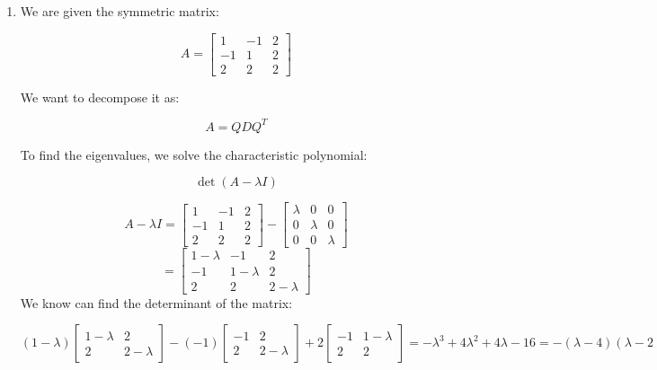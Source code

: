 \documentclass[12pt]{article}
\begin{document}
\begin{enumerate}[leftmargin=0em]
\begin{enumerate}[leftmargin=!]
    \end{enumerate}

    \item We are given the symmetric matrix:

    \[
    A = \begin{bmatrix}
    1 & -1 & 2 \\
    -1 & 1 & 2 \\
    2 & 2 & 2
    \end{bmatrix}
    \]
    
    We want to decompose it as:
    
    \[
    A = Q D Q^T
    \]
    
    To find the eigenvalues, we solve the characteristic polynomial:
    
    \[\det(A - \lambda I) \]
    
    \[ A - \lambda I = \begin{bmatrix}
    1 & -1 & 2 \\
    -1 & 1 & 2 \\
    2 & 2 & 2
    \end{bmatrix}
    -
    \begin{bmatrix}
        \lambda & 0 & 0 \\
        0 & \lambda & 0 \\
        0 & 0 & \lambda
    \end{bmatrix}
    \]
    \[
    = \begin{bmatrix}
        1 - \lambda & -1 & 2 \\
        -1 & 1-\lambda & 2 \\
        2 & 2 & 2-\lambda
    \end{bmatrix}
    \]
    We know can find the determinant of the matrix:
    
    \[(1-\lambda)
    \begin{bmatrix}
    1-\lambda & 2 \\
    2 & 2-\lambda
    \end{bmatrix}
    -(-1)
    \begin{bmatrix}
        -1 & 2 \\
        2 & 2-\lambda
    \end{bmatrix}
    +2 \begin{bmatrix}
        -1 & 1-\lambda \\
        2 & 2
    \end{bmatrix} 
    = 
    -\lambda^{3} + 4\lambda^{2}+4\lambda-16 = -(\lambda - 4)(\lambda - 2)(\lambda + 2)
    \]
    

\end{enumerate}
\end{document}
